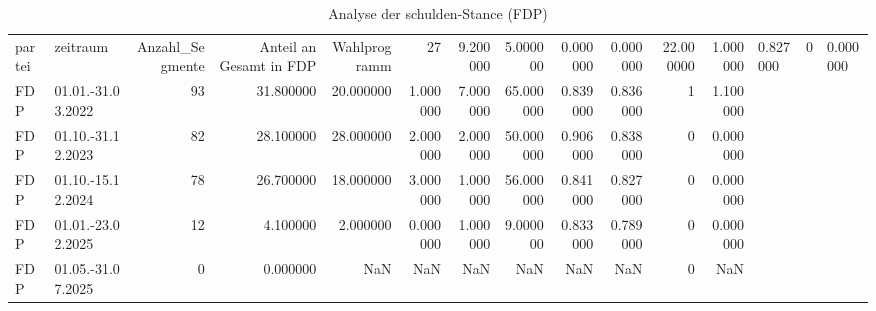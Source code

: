 \begin{table}
\caption{Analyse der schulden-Stance (FDP)}
\label{tab:meine_tabelle}
\begin{tabular}{llrrrrrrrrrr}
\toprule
partei & zeitraum & Anzahl_Segmente & Anteil an Gesamt in %
\midrule
FDP & Wahlprogramm & 27 & 9.200000 & 5.000000 & 0.000000 & 0.000000 & 22.000000 & 1.000000 & 0.827000 & 0 & 0.000000 \\
FDP & 01.01.-31.03.2022 & 93 & 31.800000 & 20.000000 & 1.000000 & 7.000000 & 65.000000 & 0.839000 & 0.836000 & 1 & 1.100000 \\
FDP & 01.10.-31.12.2023 & 82 & 28.100000 & 28.000000 & 2.000000 & 2.000000 & 50.000000 & 0.906000 & 0.838000 & 0 & 0.000000 \\
FDP & 01.10.-15.12.2024 & 78 & 26.700000 & 18.000000 & 3.000000 & 1.000000 & 56.000000 & 0.841000 & 0.827000 & 0 & 0.000000 \\
FDP & 01.01.-23.02.2025 & 12 & 4.100000 & 2.000000 & 0.000000 & 1.000000 & 9.000000 & 0.833000 & 0.789000 & 0 & 0.000000 \\
FDP & 01.05.-31.07.2025 & 0 & 0.000000 & NaN & NaN & NaN & NaN & NaN & NaN & 0 & NaN \\
\bottomrule
\end{tabular}
\end{table}
